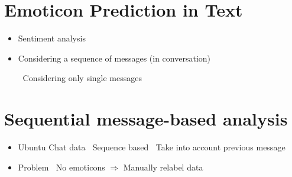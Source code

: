 \documentclass[
paper=128mm:96mm, %
fontsize=11pt, %
pagesize, %
parskip=half-, %
]{scrartcl} %
\newcommand{\red}[1]{\textit{\color{red}{#1}}}
\theoremstyle{mythmstyle} %
\begin{document}
\section{Emoticon Prediction in Text}


\begin{itemize}
\item Sentiment analysis

\item Considering a sequence of messages (in conversation)

\subitem \textbullet $\:$ Considering only single messages

\end{itemize}



\clearpage




\section{Sequential message-based analysis}

\begin{itemize}
\item Ubuntu Chat data \red{[REFERENCE]}
\subitem \textbullet $\:$ Sequence based
\subitem \textbullet $\:$ Take into account previous message

\item Problem
\subitem \textbullet $\:$ No emoticons $\Rightarrow$ Manually relabel data
\end{itemize}


\clearpage
\end{document}
